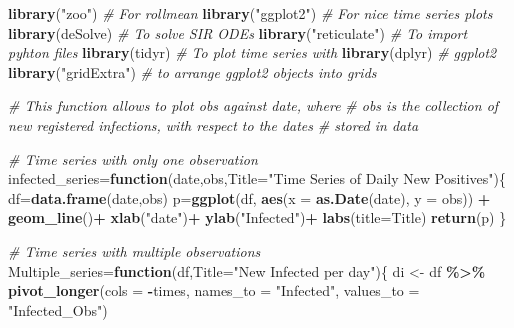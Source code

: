 \documentclass[
]{article}
\newenvironment{Shaded}{\begin{snugshade}}{\end{snugshade}}
\newcommand{\AttributeTok}[1]{\textcolor[rgb]{0.13,0.29,0.53}{#1}}
\newcommand{\CommentTok}[1]{\textcolor[rgb]{0.56,0.35,0.01}{\textit{#1}}}
\newcommand{\ControlFlowTok}[1]{\textcolor[rgb]{0.13,0.29,0.53}{\textbf{#1}}}
\newcommand{\FunctionTok}[1]{\textcolor[rgb]{0.13,0.29,0.53}{\textbf{#1}}}
\newcommand{\NormalTok}[1]{#1}
\newcommand{\OtherTok}[1]{\textcolor[rgb]{0.56,0.35,0.01}{#1}}
\newcommand{\SpecialCharTok}[1]{\textcolor[rgb]{0.81,0.36,0.00}{\textbf{#1}}}
\newcommand{\StringTok}[1]{\textcolor[rgb]{0.31,0.60,0.02}{#1}}
\begin{document}
\begin{Shaded}
\begin{Highlighting}[]
\FunctionTok{library}\NormalTok{(}\StringTok{"zoo"}\NormalTok{)                          }\CommentTok{\# For rollmean}
\FunctionTok{library}\NormalTok{(}\StringTok{"ggplot2"}\NormalTok{)                      }\CommentTok{\# For nice time series plots}
\FunctionTok{library}\NormalTok{(deSolve)                        }\CommentTok{\# To solve SIR ODEs}
\FunctionTok{library}\NormalTok{(}\StringTok{"reticulate"}\NormalTok{)                   }\CommentTok{\# To import pyhton files}
\FunctionTok{library}\NormalTok{(tidyr)                          }\CommentTok{\# To plot time series with}
\FunctionTok{library}\NormalTok{(dplyr)                          }\CommentTok{\# ggplot2}
\FunctionTok{library}\NormalTok{(}\StringTok{"gridExtra"}\NormalTok{)                    }\CommentTok{\# to arrange ggplot2 objects into grids}
 

\CommentTok{\# This function allows to plot obs against date, where}
\CommentTok{\# obs is the collection of new registered infections, with respect to the dates}
\CommentTok{\# stored in data}

\CommentTok{\# Time series with only one observation}
\NormalTok{infected\_series}\OtherTok{=}\ControlFlowTok{function}\NormalTok{(date,obs,}\AttributeTok{Title=}\StringTok{"Time Series of Daily New Positives"}\NormalTok{)\{}
\NormalTok{  df}\OtherTok{=}\FunctionTok{data.frame}\NormalTok{(date,obs)}
\NormalTok{  p}\OtherTok{=}\FunctionTok{ggplot}\NormalTok{(df, }\FunctionTok{aes}\NormalTok{(}\AttributeTok{x =} \FunctionTok{as.Date}\NormalTok{(date), }\AttributeTok{y =}\NormalTok{ obs)) }\SpecialCharTok{+}
  \FunctionTok{geom\_line}\NormalTok{()}\SpecialCharTok{+}
  \FunctionTok{xlab}\NormalTok{(}\StringTok{"date"}\NormalTok{)}\SpecialCharTok{+}
    \FunctionTok{ylab}\NormalTok{(}\StringTok{"Infected"}\NormalTok{)}\SpecialCharTok{+}
    \FunctionTok{labs}\NormalTok{(}\AttributeTok{title=}\NormalTok{Title)}
  \FunctionTok{return}\NormalTok{(p)}
\NormalTok{\}}

\CommentTok{\# Time series with multiple observations}
\NormalTok{Multiple\_series}\OtherTok{=}\ControlFlowTok{function}\NormalTok{(df,}\AttributeTok{Title=}\StringTok{"New Infected per day"}\NormalTok{)\{}
\NormalTok{  di }\OtherTok{\textless{}{-}}\NormalTok{ df }\SpecialCharTok{\%\textgreater{}\%}
  \FunctionTok{pivot\_longer}\NormalTok{(}\AttributeTok{cols =} \SpecialCharTok{{-}}\NormalTok{times, }\AttributeTok{names\_to =} \StringTok{"Infected"}\NormalTok{, }\AttributeTok{values\_to =} \StringTok{"Infected\_Obs"}\NormalTok{)}


\end{Highlighting}
\end{Shaded}
\end{document}
